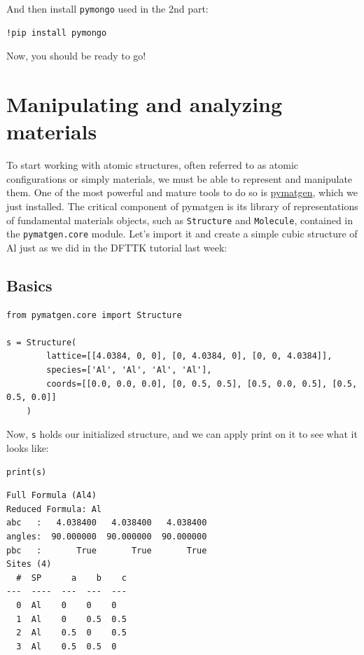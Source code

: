 And then install \texttt{pymongo} used in the 2nd part:

\begin{verbatim}
!pip install pymongo
\end{verbatim}

Now, you should be ready to go!

\hypertarget{manipulating-and-analyzing-materials}{%
\section{Manipulating and analyzing
materials}\label{pysipfenntutorial:manipulating-and-analyzing-materials}}

To start working with atomic structures, often referred to as atomic
configurations or simply materials, we must be able to represent and
manipulate them. One of the most powerful and mature tools to do so is
\href{https://github.com/materialsproject/pymatgen}{pymatgen}, which we
just installed. The critical component of pymatgen is its library of
representations of fundamental materials objects, such as
\texttt{Structure} and
\texttt{Molecule}, contained in the
\texttt{pymatgen.core} module. Let's import it and
create a simple cubic structure of Al just as we did in the DFTTK
tutorial last week:

\hypertarget{basics}{%
\subsection{Basics}\label{pysipfenntutorial:basics}}

\begin{verbatim}
from pymatgen.core import Structure

s = Structure(
        lattice=[[4.0384, 0, 0], [0, 4.0384, 0], [0, 0, 4.0384]],
        species=['Al', 'Al', 'Al', 'Al'],
        coords=[[0.0, 0.0, 0.0], [0, 0.5, 0.5], [0.5, 0.0, 0.5], [0.5, 0.5, 0.0]]
    )
\end{verbatim}

Now, \texttt{s} holds our initialized structure, and we
can apply print on it to see what it looks like:

\begin{verbatim}
print(s)
\end{verbatim}

\begin{verbatim}
Full Formula (Al4)
Reduced Formula: Al
abc   :   4.038400   4.038400   4.038400
angles:  90.000000  90.000000  90.000000
pbc   :       True       True       True
Sites (4)
  #  SP      a    b    c
---  ----  ---  ---  ---
  0  Al    0    0    0
  1  Al    0    0.5  0.5
  2  Al    0.5  0    0.5
  3  Al    0.5  0.5  0
\end{verbatim}

